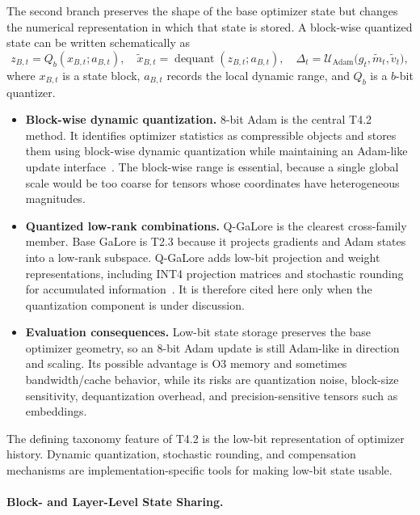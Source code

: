 The second branch preserves the shape of the base optimizer state but changes
the numerical representation in which that state is stored.  A block-wise
quantized state can be written schematically as
\begin{equation}
  z_{B,t}=Q_b(x_{B,t};a_{B,t}),\quad
  \tilde{x}_{B,t}=\operatorname{dequant}(z_{B,t};a_{B,t}),\quad
  \Delta_t=\mathcal{U}_{\mathrm{Adam}}\big(g_t,\tilde{m}_t,\tilde{v}_t\big),
  \label{eq:t4-low-bit-template}
\end{equation}
where $x_{B,t}$ is a state block, $a_{B,t}$ records the local dynamic range,
and $Q_b$ is a $b$-bit quantizer.
\begin{itemize}
  \setlength{\itemsep}{2pt}
  \item \textbf{Block-wise dynamic quantization.}  8-bit Adam is the central
  T4.2 method.  It identifies optimizer statistics as compressible objects and
  stores them using block-wise dynamic quantization while maintaining an
  Adam-like update interface~\citep{dettmers20218}.  The block-wise range is
  essential, because a single global scale would be too coarse for tensors whose
  coordinates have heterogeneous magnitudes.
  \item \textbf{Quantized low-rank combinations.}  Q-GaLore is the clearest
  cross-family member.  Base GaLore is T2.3 because it projects gradients and
  Adam states into a low-rank subspace.  Q-GaLore adds low-bit projection and
  weight representations, including INT4 projection matrices and stochastic
  rounding for accumulated information~\citep{zhao2024galore,zhang2024q}.
  It is therefore cited here only when the quantization component is under
  discussion.
  \item \textbf{Evaluation consequences.}  Low-bit state storage preserves the
  base optimizer geometry, so an 8-bit Adam update is still Adam-like in
  direction and scaling.  Its possible advantage is O3 memory and sometimes
  bandwidth/cache behavior, while its risks are quantization noise, block-size
  sensitivity, dequantization overhead, and precision-sensitive tensors such
  as embeddings.
\end{itemize}

The defining taxonomy feature of T4.2 is the low-bit representation of
optimizer history.  Dynamic quantization, stochastic rounding, and compensation
mechanisms are implementation-specific tools for making low-bit state usable.

\paragraph{Block- and Layer-Level State Sharing.}
\label{sec:t4-structure-aware}

